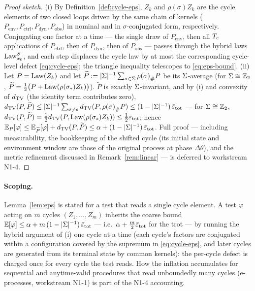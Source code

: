 \begin{proof}[Proof sketch]
(i) By Definition~\ref{def:cycle-eps}, $Z_k$ and $\rho(\sigma) Z_k$ are the
cycle elements of two closed loops driven by the same chain of kernels
($P_{\mathrm{env}}, P_{\mathrm{ctrl}}, P_{\mathrm{dyn}}, P_{\mathrm{obs}}$)
in nominal and in $\sigma$-conjugated form, respectively. Conjugating one
factor at a time --- the single draw of $P_{\mathrm{env}}$, then all $T_{\mathrm{c}}$
applications of $P_{\mathrm{ctrl}}$, then of $P_{\mathrm{dyn}}$, then of
$P_{\mathrm{obs}}$ --- passes through the hybrid laws $\operatorname{Law}^{S}_{x_0}$, and
each step displaces the
cycle law by at most the corresponding cycle-level defect
\eqref{eq:cycle-eps}; the triangle inequality telescopes to
\eqref{eq:eps-bound}. (ii) Let $P = \operatorname{Law}(Z_k)$ and let
$\widetilde P := |\Sigma|^{-1} \sum_{\sigma \in \Sigma} {\rho(\sigma)}_{\#} P$
be its $\Sigma$-average (for $\Sigma \cong \mathbb{Z}_2$,
$\widetilde P = \tfrac12\bigl(P + \operatorname{Law}(\rho(\sigma_*) Z_k)\bigr)$).
$\widetilde P$ is exactly $\Sigma$-invariant, and by (i) and convexity of
$d_{\mathrm{TV}}$ (the identity term contributes zero),
$d_{\mathrm{TV}}(P, \widetilde P) \le |\Sigma|^{-1} \sum_{\sigma \neq e}
d_{\mathrm{TV}}(P, {\rho(\sigma)}_{\#}P) \le (1 - |\Sigma|^{-1})\,\bar\varepsilon_{\mathrm{tot}}$ ---
for $\Sigma \cong \mathbb{Z}_2$, $d_{\mathrm{TV}}(P,\widetilde P) = \tfrac12
d_{\mathrm{TV}}(P, \operatorname{Law}(\rho(\sigma_*)Z_k)) \le \tfrac12 \bar\varepsilon_{\mathrm{tot}}$; hence
$\mathbb{E}_P[\varphi] \le \mathbb{E}_{\widetilde P}[\varphi] +
d_{\mathrm{TV}}(P,\widetilde P) \le \alpha + (1 - |\Sigma|^{-1})\,\bar\varepsilon_{\mathrm{tot}}$.
Full proof --- including measurability, the bookkeeping of the shifted cycle
(its initial state and environment window are those of the original process
at phase $\Delta\theta$), and the metric refinement discussed in
Remark~\ref{rem:linear} --- is deferred to workstream N1-4.
\end{proof}

\paragraph{Scoping.}
Lemma~\ref{lem:eps} is stated for a test that reads a single cycle element.
A test $\varphi$ acting on $m$ cycles $(Z_1,\dots,Z_m)$ inherits the coarse
bound $\mathbb{E}[\varphi] \le \alpha + m\,(1-|\Sigma|^{-1})\,\bar\varepsilon_{\mathrm{tot}}$
--- i.e.\ $\alpha + \tfrac{m}{2}\bar\varepsilon_{\mathrm{tot}}$ for the trot --- by running the
hybrid argument of (i) one cycle at a time (each cycle's factors are
conjugated within a configuration covered by the supremum in
\eqref{eq:cycle-eps}, and later cycles are generated from its terminal state
by common kernels): the per-cycle defect is charged once for every cycle the
test reads. How the inflation accumulates for sequential and anytime-valid
procedures that read unboundedly many cycles (e-processes, workstream N1-1)
is part of the N1-4 accounting.

